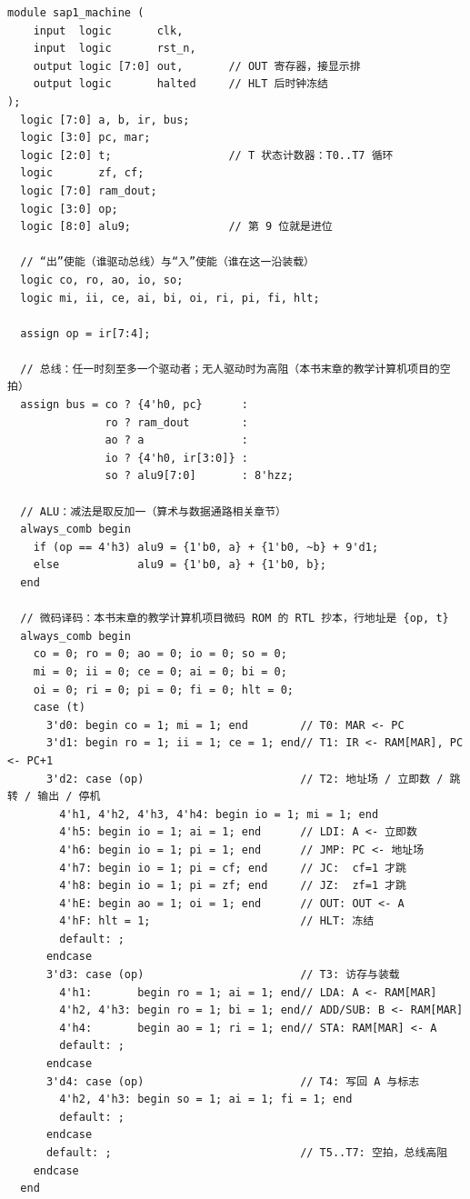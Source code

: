 \begin{lstlisting}
module sap1_machine (
    input  logic       clk,
    input  logic       rst_n,
    output logic [7:0] out,       // OUT 寄存器，接显示排
    output logic       halted     // HLT 后时钟冻结
);
  logic [7:0] a, b, ir, bus;
  logic [3:0] pc, mar;
  logic [2:0] t;                  // T 状态计数器：T0..T7 循环
  logic       zf, cf;
  logic [7:0] ram_dout;
  logic [3:0] op;
  logic [8:0] alu9;               // 第 9 位就是进位

  // “出”使能（谁驱动总线）与“入”使能（谁在这一沿装载）
  logic co, ro, ao, io, so;
  logic mi, ii, ce, ai, bi, oi, ri, pi, fi, hlt;

  assign op = ir[7:4];

  // 总线：任一时刻至多一个驱动者；无人驱动时为高阻（本书末章的教学计算机项目的空拍）
  assign bus = co ? {4'h0, pc}      :
               ro ? ram_dout        :
               ao ? a               :
               io ? {4'h0, ir[3:0]} :
               so ? alu9[7:0]       : 8'hzz;

  // ALU：减法是取反加一（算术与数据通路相关章节）
  always_comb begin
    if (op == 4'h3) alu9 = {1'b0, a} + {1'b0, ~b} + 9'd1;
    else            alu9 = {1'b0, a} + {1'b0, b};
  end

  // 微码译码：本书末章的教学计算机项目微码 ROM 的 RTL 抄本，行地址是 {op, t}
  always_comb begin
    co = 0; ro = 0; ao = 0; io = 0; so = 0;
    mi = 0; ii = 0; ce = 0; ai = 0; bi = 0;
    oi = 0; ri = 0; pi = 0; fi = 0; hlt = 0;
    case (t)
      3'd0: begin co = 1; mi = 1; end        // T0: MAR <- PC
      3'd1: begin ro = 1; ii = 1; ce = 1; end// T1: IR <- RAM[MAR], PC <- PC+1
      3'd2: case (op)                        // T2: 地址场 / 立即数 / 跳转 / 输出 / 停机
        4'h1, 4'h2, 4'h3, 4'h4: begin io = 1; mi = 1; end
        4'h5: begin io = 1; ai = 1; end      // LDI: A <- 立即数
        4'h6: begin io = 1; pi = 1; end      // JMP: PC <- 地址场
        4'h7: begin io = 1; pi = cf; end     // JC:  cf=1 才跳
        4'h8: begin io = 1; pi = zf; end     // JZ:  zf=1 才跳
        4'hE: begin ao = 1; oi = 1; end      // OUT: OUT <- A
        4'hF: hlt = 1;                       // HLT: 冻结
        default: ;
      endcase
      3'd3: case (op)                        // T3: 访存与装载
        4'h1:       begin ro = 1; ai = 1; end// LDA: A <- RAM[MAR]
        4'h2, 4'h3: begin ro = 1; bi = 1; end// ADD/SUB: B <- RAM[MAR]
        4'h4:       begin ao = 1; ri = 1; end// STA: RAM[MAR] <- A
        default: ;
      endcase
      3'd4: case (op)                        // T4: 写回 A 与标志
        4'h2, 4'h3: begin so = 1; ai = 1; fi = 1; end
        default: ;
      endcase
      default: ;                             // T5..T7: 空拍，总线高阻
    endcase
  end


\end{lstlisting}
